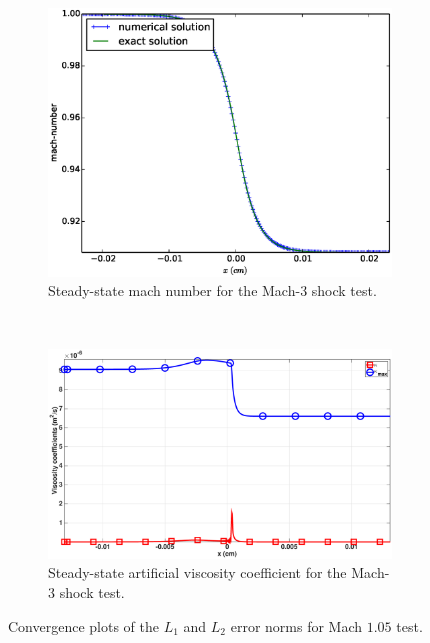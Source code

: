 \documentclass[times,doublespace]{fldauth}%
\begin{document}
\begin{figure}[H]
    \begin{subfigure}{0.5\textwidth}
    \centering
    \includegraphics[width=\linewidth]{figures/cst-xs/mach-1p05-mach-number-plot.eps}
    \caption{Steady-state mach number for the Mach-3 shock test.}\label{fig:mach-3-cst-xs-mach}
    \end{subfigure}
    ~
    \begin{subfigure}{0.5\textwidth}
    \centering
    \includegraphics[width=\linewidth]{figures/cst-xs/mach_3_cst_xs_nel_1000_viscosity.eps}
    \caption{Steady-state artificial viscosity coefficient for the Mach-3 shock test.}\label{fig:mach-3-cst-xs-visc}
    \end{subfigure}        
\caption{Convergence plots of the $L_1$ and $L_2$ error norms for Mach $1.05$ test.}\label{fig:mach-3-cst-xs}    
\end{figure}
\end{document}

